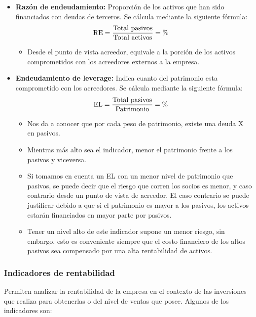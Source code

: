 \documentclass{templateNote}
\begin{document}
\begin{itemize}
    \item \textbf{Razón de endeudamiento:} Proporción de los activos que han sido financiados con deudas de terceros. Se cálcula mediante la siguiente fórmula:
    \begin{align*}
        \textnormal{RE} &= \frac{\textnormal{Total pasivos}}{\textnormal{Total activos}} = \%
    \end{align*}
    \begin{itemize}
        \item Desde el punto de vista acreedor, equivale a la porción de los activos comprometidos con los acreedores externos a la empresa.
    \end{itemize}
    \item \textbf{Endeudamiento de leverage:} Indica cuanto del patrimonio esta comprometido con los acreedores. Se cálcula mediante la siguiente fórmula: 
    \begin{align*}
        \textnormal{EL} &= \frac{\textnormal{Total pasivos}}{\textnormal{Patrimonio}} = \%
    \end{align*}
    \begin{itemize}
        \item Nos da a conocer que por cada peso de patrimonio, existe una deuda X en pasivos.
        \item Mientras más alto sea el indicador, menor el patrimonio frente a los pasivos y viceversa.
        \item Si tomamos en cuenta un EL con un menor nivel de patrimonio que pasivos, se puede decir que el riesgo que corren los socios es menor, y caso contrario desde un punto de vista de acreedor. El caso contrario se puede justificar debido a que si el patrimonio es mayor a los pasivos, los activos estarán financiados en mayor parte por pasivos.
        \item Tener un nivel alto de este indicador supone un menor riesgo, sin embargo, esto es conveniente siempre que el costo financiero de los altos pasivos sea compensado por una alta rentabilidad de activos.
    \end{itemize}
\end{itemize}

\subsubsection{Indicadores de rentabilidad}
\noindent Permiten analizar la rentabilidad de la empresa en el contexto de las inversiones que realiza para obtenerlas o del nivel de ventas que posee. Algunos de los indicadores son:
\end{document}
